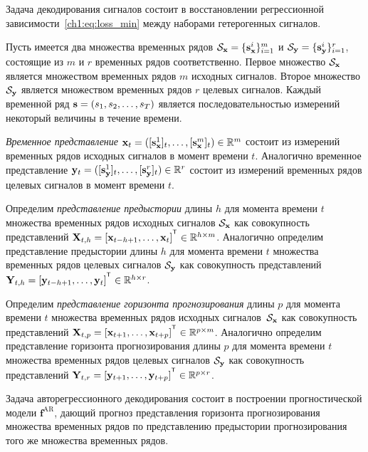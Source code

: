 \documentclass[11pt, a5paper]{dissert}
\begin{document}
Задача декодирования сигналов состоит в восстановлении регрессионной зависимости~\eqref{ch1:eq:loss_min} между наборами гетерогенных сигналов.

Пусть имеется два множества временных рядов $\mathcal{S}_{\mathbf{x}} = \{\mathbf{s}_{\mathbf{x}}^i\}_{i=1}^m$ и $\mathcal{S}_{\mathbf{y}} = \{\mathbf{s}_{\mathbf{y}}^i\}_{i=1}^r$, состоящие из $m$ и $r$ временных рядов соответственно. 
Первое множество $\mathcal{S}_{\mathbf{x}}$ является множеством временных рядов $m$ исходных сигналов. 
Второе множество $\mathcal{S}_{\mathbf{y}}$ является множеством временных рядов $r$ целевых сигналов.
Каждый временной ряд $\mathbf{s} = (s_1, s_2, \dots, s_T)$ является последовательностью измерений некоторый величины в течение времени. 
\begin{definition}
	 \textit{Временное представление} $\mathbf{x}_t = ([\mathbf{s}_{\mathbf{x}}^1]_t, \dots, [\mathbf{s}_{\mathbf{x}}^m]_t) \in \mathbb{R}^m$ состоит из измерений временных рядов исходных сигналов в момент времени $t$. 
	Аналогично временное представление $\mathbf{y}_t = ([\mathbf{s}_{\mathbf{y}}^1]_t, \dots, [\mathbf{s}_{\mathbf{y}}^r]_t) \in \mathbb{R}^r$ состоит из измерений временных рядов целевых сигналов в момент времени $t$.
\end{definition}
\begin{definition}
	Определим \textit{представление предыстории} длины $h$ для момента времени $t$ множества временных рядов исходных сигналов $\mathcal{S}_{\mathbf{x}}$ как совокупность представлений $\bX_{t,h} = [\bx_{t - h + 1}, \dots, \bx_{t}]^{\T} \in \bbR^{h \times m}$.
	Аналогично определим представление предыстории длины $h$ для момента времени $t$ множества временных рядов целевых сигналов $\mathcal{S}_{\mathbf{y}}$ как совокупность представлений $\bY_{t,h} = [\by_{t - h + 1}, \dots, \by_{t}]^{\T} \in \bbR^{h \times r}$.
\end{definition}
\begin{definition}
	Определим \textit{представление горизонта прогнозирования} длины $p$ для момента времени $t$ множества временных рядов исходных сигналов~$\mathcal{S}_{\mathbf{x}}$ как совокупность представлений $\bX_{t,p} = [\bx_{t + 1}, \dots, \bx_{t + p}]^{\T} \in \bbR^{p \times m}$.
	Аналогично определим представление горизонта прогнозирования длины $p$ для момента времени $t$ множества временных рядов целевых сигналов $\mathcal{S}_{\mathbf{y}}$ как совокупность представлений $\bY_{t,r} = [\by_{t + 1}, \dots, \by_{t + p}]^{\T} \in \bbR^{p \times r}$.
\end{definition}

Задача авторегрессионного декодирования состоит в построении прогностической модели $\mathbf{f}^{\text{AR}}$, дающий прогноз представления горизонта прогнозирования множества временных рядов по представлению предыстории прогнозирования того же множества временных рядов.
\end{document}
